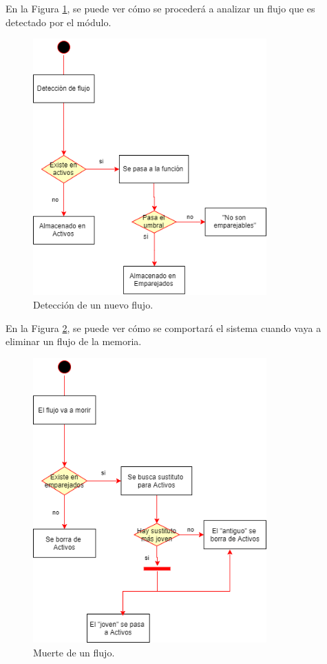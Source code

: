 \intro En la Figura \ref{fig.nacimiento}, se puede ver cómo se procederá a analizar un flujo que es detectado por el módulo.

\begin{figure}[H]
  \includegraphics[width=0.8\textwidth]{imagenes/nacimiento.png}
  \centering
  \caption{Detección de un nuevo flujo.}\label{fig.nacimiento}
\end{figure}

\intro En la Figura \ref{fig.muerte}, se puede ver cómo se comportará el sistema cuando vaya a eliminar un flujo de la memoria.


\begin{figure}[H]
  \includegraphics[width=0.8\textwidth]{imagenes/muerte.png}
  \centering
  \caption{Muerte de un flujo.}\label{fig.muerte}
\end{figure}

